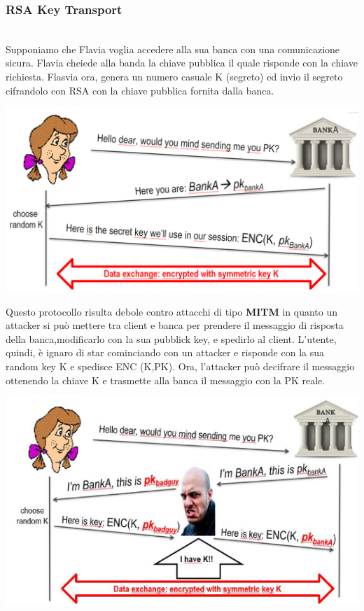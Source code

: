 \documentclass{book}
\theoremstyle{remark}
\begin{document}
\subsubsection{RSA Key Transport}\mbox{}\\
Supponiamo che Flavia voglia accedere alla sua banca con una comunicazione sicura\@. Flavia cheiede alla banda la chiave pubblica il quale risponde con la chiave richiesta\@. Flasvia ora, genera un numero casuale K (segreto) ed invio il segreto cifrandolo con RSA con la chiave pubblica fornita dalla banca\@.
\begin{center}
	\includegraphics[scale=0.5]{2021-12-05-18-56-31.png}
\end{center}
Questo protocollo risulta debole contro attacchi di tipo \textbf{MITM} in quanto un attacker si può mettere tra client e banca per prendere il messaggio di risposta della banca,modificarlo con la sua pubblick key, e spedirlo al client\@. L'utente, quindi, è ignaro di star cominciando con un attacker e risponde con la sua random key K e spedisce ENC (K,PK)\@. Ora, l'attacker può decifrare il messaggio ottenendo la chiave K e trasmette alla banca il messaggio con la PK reale\@.
\begin{center}
	\includegraphics[scale=0.6]{2021-12-05-19-01-56.png}
\end{center}
\end{document}

